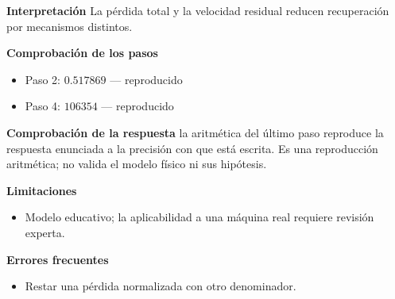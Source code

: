 \documentclass[10pt,openany]{book}
\begin{document}
\begin{tcolorbox}[title={Problema resuelto 2}, studiumworked, breakable]
\noindent\textbf{Interpretación}
La pérdida total y la velocidad residual reducen recuperación por mecanismos distintos.

\noindent\textbf{Comprobación de los pasos}
\begin{itemize}
\item Paso 2: $0.517869$ — reproducido
\item Paso 4: $106354$ — reproducido
\end{itemize}

\noindent\textbf{Comprobación de la respuesta} la aritmética del último paso reproduce la respuesta enunciada a la precisión con que está escrita. Es una reproducción aritmética; no valida el modelo físico ni sus hipótesis.

\noindent\textbf{Limitaciones}
\begin{itemize}
\item Modelo educativo; la aplicabilidad a una máquina real requiere revisión experta.
\end{itemize}

\noindent\textbf{Errores frecuentes}
\begin{itemize}
\item Restar una pérdida normalizada con otro denominador.
\end{itemize}
\end{tcolorbox}
\end{document}
